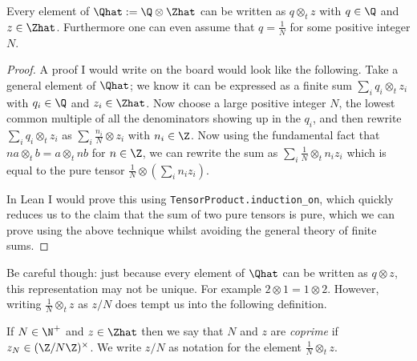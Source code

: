 \begin{lemma}
    \label{QHat.canonicalForm}
    \leanok
    Every element of $\Qhat:=\Q\otimes\Zhat$ can be written as $q\otimes_t z$ with $q\in\Q$ and $z\in\Zhat$.
    Furthermore one can even assume that $q=\frac{1}{N}$ for some positive integer $N$.
\end{lemma}
\begin{proof} \leanok
    A proof I would write on the board would look like the following. Take a general
    element of $\Qhat$; we know it can be expressed as a finite sum
    $\sum_i q_i\otimes_t z_i$ with $q_i\in\Q$ and $z_i\in\Zhat$. Now choose a large
    positive integer $N$, the lowest common multiple of all the denominators showing up in the
    $q_i$, and then rewrite $\sum_i q_i\otimes_t z_i$ as $\sum_i \frac{n_i}{N}\otimes z_i$ with
    $n_i\in\Z$. Now using the fundamental fact that $na\otimes_t b=a\otimes_t nb$ for $n\in\Z$,
    we can rewrite the sum as $\sum_i \frac{1}{N}\otimes_t n_i z_i$
    which is equal to the pure tensor $\frac{1}{N}\otimes(\sum_i n_i z_i)$.

    In Lean I would prove this using {\tt TensorProduct.induction\_on}, which quickly
    reduces us to the claim that the sum of two pure tensors is pure, which we can prove
    using the above technique whilst avoiding the general theory of finite sums.
\end{proof}

Be careful though: just because every element of $\Qhat$ can be written as $q\otimes z$, this
representation may not be unique. For example $2\otimes 1=1\otimes 2$. However, writing
$\frac{1}{N}\otimes_t z$ as $z/N$ does tempt us into the following definition.

\begin{definition}
    \label{QHat.IsCoprime}
    \leanok
    If $N\in\N^+$ and $z\in\Zhat$ then we say that $N$ and $z$ are \emph{coprime} if
    $z_N\in(\Z/N\Z)^\times$. We write $z/N$ as notation
    for the element $\frac{1}{N}\otimes_tz$.
\end{definition}

